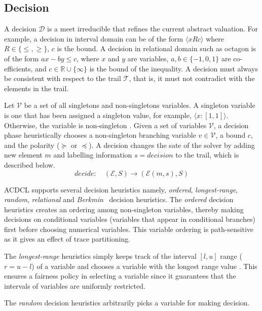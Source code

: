 \subsection{Decision}
A decision $\mathcal{D}$ is a meet irreducible that refines the 
current abstract valuation.  For example, a decision in interval 
domain can be of the form $\langle x R c \rangle$ where 
$R \in \{\leq, \geq\}$, $c$ is the bound.  A decision in 
relational domain such as octagon is of the form $ax - by \leq c$, 
where $x$ and $y$ are variables, $a,b \in \{-1,0,1\}$ are co-efficients, 
and $c \in \mathbb{R}\cup\{\infty\}$ is the bound of the inequality.    
A decision must always be consistent with respect to the trail 
$\mathcal{T}$, that is, it must not contradict with the elements 
in the trail.  

Let $\mathcal{V}$ be a set of all singletons and non-singletons 
variables.  A singleton variable is one that has been assigned a 
singleton value, for example, $\langle x:[1,1] \rangle$.  Otherwise, 
the variable is non-singleton .  Given a set of variables $\mathcal{V}$, 
a decision phase heuristically chooses a non-singleton branching 
variable $v \in \mathcal{V}$, a bound $c$, and the polarity ($\succeq$ or 
$\preceq$).  A decision changes the sate of the solver by adding new element 
$m$ and labelling information $s=decision$ to the trail, which is described below. 
\[decide: \quad (\mathcal{E},S) \rightarrow (\mathcal{E}(m,s),S) \]

ACDCL supports several decision heuristics namely, {\em ordered}, 
{\em longest-range}, {\em random}, {\em relational} and 
{\em Berkmin}~\cite{eugoldberg07} decision heuristics.  
The {\em ordered} decision heuristics creates an ordering among non-singleton 
variables, thereby making decisions on conditional variables (variables that 
appear in conditional branches) first before choosing numerical variables.  
This variable ordering is path-sensitive as it gives an effect of trace
partitioning.  

The {\em longest-range} heuristics simply keeps track of the
interval $[l,u]$ range ($r=u-l$) of a variable and chooses a variable with 
the longest range value .  This ensures a fairness policy in selecting a 
variable since it guarantees that the intervals of variables are uniformly 
restricted.  

The {\em random} decision heuristics arbitrarily picks a variable 
for making decision. 

